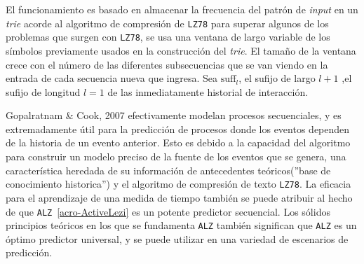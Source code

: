 \begin{enumerate}
{El funcionamiento es basado en almacenar la frecuencia del patrón de \emph{input} en un \emph{trie} acorde al algoritmo de compresión de \texttt{LZ78} para superar algunos de los problemas que surgen con \texttt{LZ78}, se usa una ventana de largo variable de los símbolos previamente usados en la construcción del \emph{trie}. El tamaño de la ventana crece con el número de las diferentes subsecuencias que se van viendo en la entrada de cada secuencia nueva que ingresa.  Sea ${\mbox{suff}}_{l}$,  el sufijo de largo $l+1$ ,el sufijo de longitud $l=1$ de las inmediatamente historial de interacción.%

Gopalratnam \& Cook, 2007 \etal\cite{Gopalratnam2007} efectivamente modelan procesos secuenciales, y es extremadamente útil para la predicción de procesos donde los eventos dependen de la historia de un evento anterior. Esto es debido a la capacidad del algoritmo para construir un modelo preciso de la fuente de los eventos que se genera, una característica heredada de su información de antecedentes teóricos(''base de conocimiento historica'') y el algoritmo de compresión de texto \texttt{LZ78}. La eficacia para el aprendizaje de una medida de tiempo también se puede atribuir al hecho de que \texttt{ALZ}~\ref{acro-ActiveLezi} es un potente predictor secuencial. Los sólidos principios teóricos en los que se fundamenta \texttt{ALZ} también significan que \texttt{ALZ} es un óptimo predictor universal, y se puede utilizar en una variedad de escenarios de predicción.
	
  	
  	  

 
 
 }




\end{enumerate}
